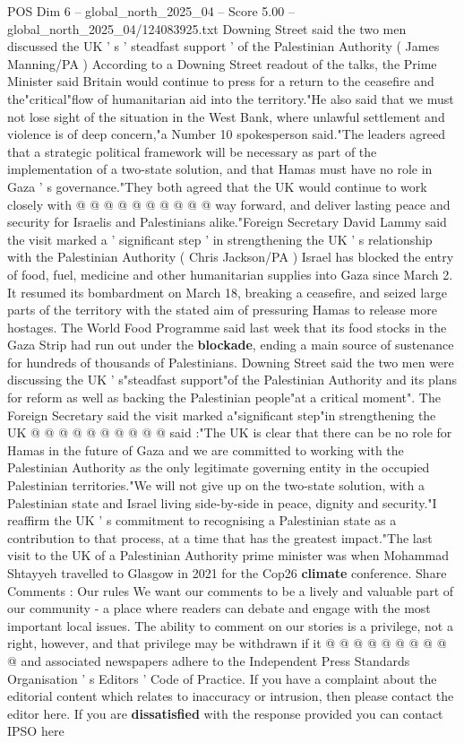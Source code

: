 \begin{textsample}{POS Dim 6 – global\_north\_2025\_04 – Score 5.00 – global\_north\_2025\_04/124083925.txt}
Downing Street said the two men discussed the UK ' s ' steadfast support ' of the Palestinian Authority ( James Manning/PA ) According to a Downing Street readout of the talks, the Prime Minister said Britain would continue to press for a return to the ceasefire and the"critical"flow of humanitarian aid into the territory."He also said that we must not lose sight of the situation in the West Bank, where unlawful settlement and violence is of deep concern,"a Number 10 spokesperson said."The leaders agreed that a strategic political framework will be necessary as part of the implementation of a two-state solution, and that Hamas must have no role in Gaza ' s governance."They both agreed that the UK would continue to work closely with @ @ @ @ @ @ @ @ @ @ way forward, and deliver lasting peace and security for Israelis and Palestinians alike."Foreign Secretary David Lammy said the visit marked a ' significant step ' in strengthening the UK ' s relationship with the Palestinian Authority ( Chris Jackson/PA ) Israel has blocked the entry of food, fuel, medicine and other humanitarian supplies into Gaza since March 2.
It resumed its bombardment on March 18, breaking a ceasefire, and seized large parts of the territory with the stated aim of pressuring Hamas to release more hostages.
The World Food Programme said last week that its food stocks in the Gaza Strip had run out under the \textbf{blockade}, ending a main source of sustenance for hundreds of thousands of Palestinians.
Downing Street said the two men were discussing the UK ' s"steadfast support"of the Palestinian Authority and its plans for reform as well as backing the Palestinian people"at a critical moment".
The Foreign Secretary said the visit marked a"significant step"in strengthening the UK @ @ @ @ @ @ @ @ @ @ said :"The UK is clear that there can be no role for Hamas in the future of Gaza and we are committed to working with the Palestinian Authority as the only legitimate governing entity in the occupied Palestinian territories."We will not give up on the two-state solution, with a Palestinian state and Israel living side-by-side in peace, dignity and security."I reaffirm the UK ' s commitment to recognising a Palestinian state as a contribution to that process, at a time that has the greatest impact."The last visit to the UK of a Palestinian Authority prime minister was when Mohammad Shtayyeh travelled to Glasgow in 2021 for the Cop26 \textbf{climate} conference.
Share Comments : Our rules We want our comments to be a lively and valuable part of our community - a place where readers can debate and engage with the most important local issues.
The ability to comment on our stories is a privilege, not a right, however, and that privilege may be withdrawn if it @ @ @ @ @ @ @ @ @ @ and associated newspapers adhere to the Independent Press Standards Organisation ' s Editors ' Code of Practice.
If you have a complaint about the editorial content which relates to inaccuracy or intrusion, then please contact the editor here.
If you are \textbf{dissatisfied} with the response provided you can contact IPSO here

\end{textsample}
